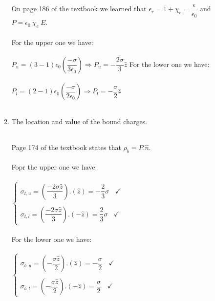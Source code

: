 \documentclass[fleqn]{article}
\begin{document}
\begin{enumerate}
\begin{enumerate}
        \textcolor{hwColor}{
          \\
          On page 186 of the textbook we learned that $\epsilon_r=1+\chi_e=\dfrac{\epsilon}{\epsilon_0}$ and 
          $P=\epsilon_0 ~ \chi_e ~ E$.
          \\
          \\
          For the upper one we have:
          \\
          \\
          $
            P_u=(3-1)\epsilon_0 \left(\dfrac{-\sigma}{3 \epsilon_0}\right) \Longrightarrow P_u=-\dfrac{2 \sigma}{3} \hat{z}
          $
          For the lower one we have:
          \\
          \\
          $
            P_l=(2-1)\epsilon_0 \left(\dfrac{-\sigma}{2 \epsilon_0}\right) \Longrightarrow P_l=-\dfrac{\sigma}{2} \hat{z}
          $
          \\
          \\
        }

      \item The location and value of the bound charges.

        \textcolor{hwColor}{
          \\
          Page 174 of the textbook states that $\rho_b=P.\hat{n}$.
          \\
          \\
          Fopr the upper one we have:
          \\
          \\
          $
            \begin{cases}
              \sigma_{t, u}=\left(\dfrac{-2 \sigma \hat{z}}{3}\right).\left(\hat{z}\right)=-\dfrac{2}{3} \sigma ~~~~ \checkmark
              \\
              \\
              \sigma_{t, l}=\left(\dfrac{-2 \sigma \hat{z}}{3}\right).\left(-\hat{z}\right)=\dfrac{2}{3} \sigma ~~~~ \checkmark
            \end{cases}
          $
          \\
          \\
          For the lower one we have:
          \\
          \\
          $
            \begin{cases}
              \sigma_{b, u}=\left(-\dfrac{\sigma \hat{z}}{2}\right).\left(\hat{z}\right)=-\dfrac{\sigma}{2} ~~~~ \checkmark
              \\
              \\
              \sigma_{b, l}=\left(-\dfrac{\sigma \hat{z}}{2}\right).\left(-\hat{z}\right)=\dfrac{\sigma}{2}  ~~~~ \checkmark
            \end{cases}
          $
          \\
          \\
        }
  

\end{enumerate}
\end{enumerate}
\end{document}
